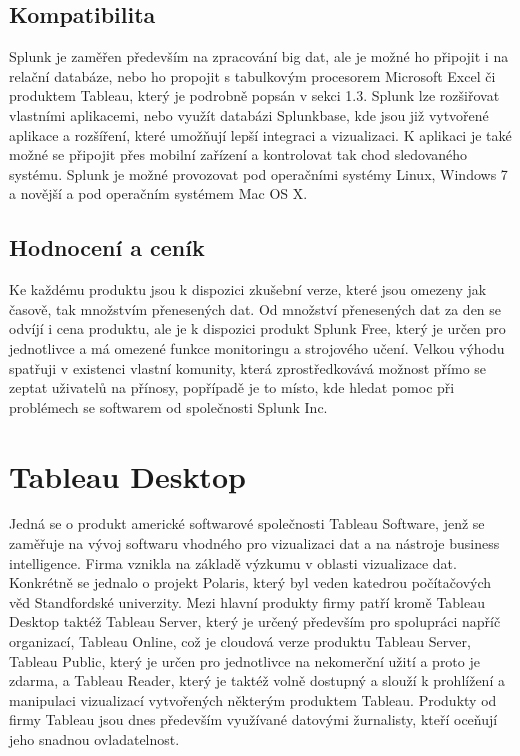 \documentclass[czech,BP]{thesiskiv}
\begin{document}
\subsection{Kompatibilita}
Splunk je zaměřen především na zpracování big dat, ale je možné ho připojit i na relační databáze, nebo ho propojit s tabulkovým procesorem Microsoft Excel či produktem Tableau, který je podrobně popsán v sekci 1.3. Splunk lze rozšiřovat vlastními aplikacemi, nebo využít databázi Splunkbase, kde jsou již vytvořené aplikace a rozšíření, které umožňují lepší integraci a vizualizaci. K aplikaci je také možné se připojit přes mobilní zařízení a kontrolovat tak chod sledovaného systému. Splunk je možné provozovat pod operačními systémy Linux, Windows 7 a novější a pod operačním systémem Mac OS X. \cite{Splunk_a_kompatibilita}

\subsection{Hodnocení a ceník}
 Ke každému produktu jsou k dispozici zkušební verze, které jsou omezeny jak časově, tak množstvím přenesených dat. Od množství přenesených dat za den se odvíjí i cena produktu, ale je k dispozici produkt Splunk Free, který je určen pro jednotlivce a má omezené funkce monitoringu a strojového učení. Velkou výhodu spatřuji v existenci vlastní komunity, která zprostředkovává možnost přímo se zeptat uživatelů na přínosy, popřípadě je to místo, kde hledat pomoc při problémech se softwarem od společnosti Splunk Inc.
 
 
 \section{Tableau Desktop}
 Jedná se o produkt americké softwarové společnosti Tableau Software, jenž se zaměřuje na vývoj softwaru vhodného pro vizualizaci dat a na nástroje business intelligence. Firma vznikla na základě výzkumu v oblasti vizualizace dat. Konkrétně se jednalo o projekt Polaris, který byl veden katedrou počítačových věd Standfordské univerzity.\cite{TableauHistory} Mezi hlavní produkty firmy patří kromě Tableau Desktop taktéž Tableau Server, který je určený především pro spolupráci napříč organizací, Tableau Online, což je cloudová verze produktu Tableau Server, Tableau Public, který je určen pro jednotlivce na nekomerční užití a proto je zdarma, a Tableau Reader, který je taktéž volně dostupný a slouží k prohlížení a manipulaci vizualizací vytvořených některým produktem Tableau. Produkty od firmy Tableau jsou dnes především využívané datovými žurnalisty, kteří oceňují jeho snadnou ovladatelnost.
 
\end{document}
